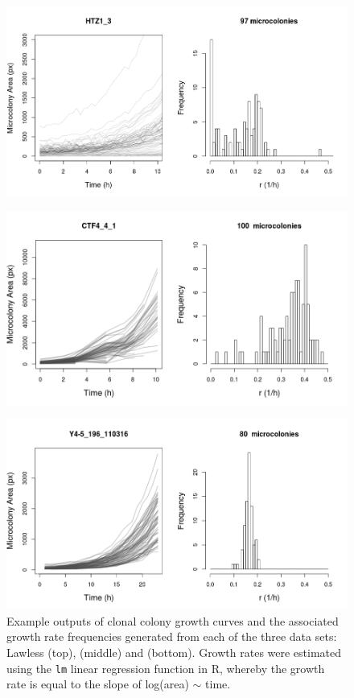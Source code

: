 \documentclass{bioinfo}
\begin{document}
\vspace{-1.5em}
\begin{figure}[H]
\includegraphics[width=1\linewidth]{LawlessExampleOutput4.png}
\end{figure}
\vspace{-4.3em}
\begin{figure}[H]
\includegraphics[width=1\linewidth]{LevyExampleOutput.png}
\end{figure}
\vspace{-4.3em}
\begin{figure}[H]
\includegraphics[width=1\linewidth]{ZivExampleOutput3.png}
\caption{Example outputs of clonal colony growth curves and the associated growth rate frequencies generated from each of the three data sets: Lawless (top), \citealp{Levy12} (middle) and \citealp{Ziv13} (bottom). Growth rates were estimated using the \texttt{lm} linear regression function in R, whereby the growth rate is equal to the slope of log(area) $\sim$ time.}
\label{fig:ExampleOutput}
\end{figure}
\vspace{-3em}
\end{document}
